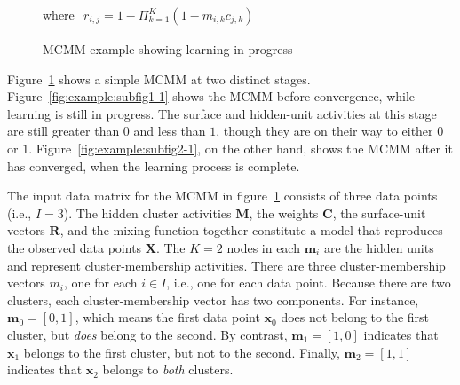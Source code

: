 {\begin{figure}[!b]
\begin{center}
{
 }
 \begin{framed}
 	\centering
 	\small
 	where
 	$\begin{aligned}
 	   r_{i,j} = 1 - \Pi_{k=1}^{K} (1 - m_{i,k}c_{j,k}) 
 	\end{aligned}$
 \end{framed}
 \caption{MCMM example showing learning in progress}
 \label{fig:example-1}
 \end{center}
 \end{figure}

Figure~\ref{fig:example-1} shows a simple MCMM at two distinct stages. Figure~\ref{fig:example:subfig1-1} shows the MCMM before convergence, while learning is still in progress. The surface and hidden-unit activities at this stage are still greater than $0$ and less than $1$, though they are on their way to either $0$ or $1$. Figure~\ref{fig:example:subfig2-1}, on the other hand, shows the MCMM after it has converged, when the learning process is complete.

The input data matrix for the MCMM in figure~\ref{fig:example-1} consists of three data points (i.e., $I = 3$).
The hidden cluster activities $\mathbf{M}$, the weights $\mathbf{C}$, the surface-unit vectors $\mathbf{R}$,
and the mixing function together constitute a model that reproduces the
observed data points $\mathbf{X}$.
The $K = 2$ nodes in each $\mathbf{m}_i$
are the hidden units and represent cluster-membership activities. There are three cluster-membership vectors $m_{i}$, one for each $i \in I$, i.e., one for each data point. Because there are two clusters, each cluster-membership vector has two components. For instance, $\textbf{m}_{0} = [0, 1]$, which means the first data point $\textbf{x}_{0}$ does not belong to the first cluster, but \emph{does} belong to the second. By contrast, $\textbf{m}_{1} = [1,0]$ indicates that $\textbf{x}_{1}$ belongs to the first cluster, but not to the second. Finally, $\textbf{m}_{2} = [1,1]$ indicates that  $\textbf{x}_{2}$ belongs to \emph{both} clusters. 

}
